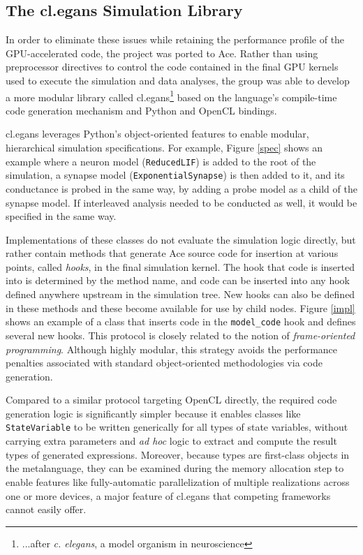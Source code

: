 \documentclass[10pt, conference, compsocconf]{IEEEtran}
\begin{document}
\subsection{The {\sf cl.egans} Simulation Library}
In order to eliminate these issues while retaining the performance profile of the GPU-accelerated code, the project was ported to Ace. Rather than using preprocessor directives to control the code contained in the final GPU kernels used to execute the simulation and data analyses, the group was able to develop a more modular  library called {\sf cl.egans}\footnote{...after {\it c. elegans}, a model organism in neuroscience} based on the language's compile-time code generation mechanism and Python and OpenCL bindings.

{\sf cl.egans} leverages Python's object-oriented features to enable modular, hierarchical simulation specifications. For example, Figure \ref{spec} shows an example where a neuron model (\verb|ReducedLIF|) is added to the root of the simulation, a synapse model (\verb|ExponentialSynapse|) is then added to it, and its conductance is probed in the same way, by adding a probe model as a child of the synapse model. If interleaved analysis needed to be conducted as well, it would be specified in the same way.

Implementations of these classes do not evaluate the simulation logic directly, but rather contain methods that generate Ace source code for insertion at various points, called {\it hooks}, in the final simulation kernel. The hook that code is inserted into is determined by the method name, and code can be inserted into any hook defined anywhere upstream in the simulation tree. New hooks can also be defined in these methods and these become available for use by child nodes. Figure \ref{impl} shows an example of a class that inserts code in the \verb|model_code| hook and defines several new hooks. This protocol is closely related to the notion of {\it frame-oriented programming}. Although highly modular, this strategy avoids the performance penalties associated with standard object-oriented methodologies via code generation.

Compared to a similar protocol targeting OpenCL directly, the required code generation logic is significantly simpler because it enables classes like \verb|StateVariable| to be written generically for all types of state variables, without carrying extra parameters and {\it ad hoc} logic to extract and compute the result types of generated expressions. Moreover, because types are first-class objects in the metalanguage, they can be examined during the memory allocation step to enable features like fully-automatic parallelization of multiple realizations across one or more devices, a major feature of {\sf cl.egans} that competing frameworks cannot easily offer.
\end{document}
